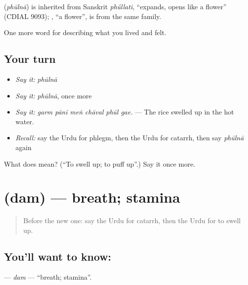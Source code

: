 \begin{cousinweb}
\textbf{} (\emph{phūlnā}) is inherited from Sanskrit \emph{phúllati}, \textquotedblleft{}expands, opens like a flower\textquotedblright{} (CDIAL 9093); \textbf{}, \textquotedblleft{}a flower\textquotedblright{}, is from the same family.
\end{cousinweb}

\begin{grammarlens}[title={What you've built}]
One more word for describing what you lived and felt.
\end{grammarlens}

\subsection*{Your turn}
\begin{itemize}
\raggedright
  \item \emph{Say it:} \emph{phūlnā}
  \item \emph{Say it:} \emph{phūlnā}, once more
  \item \emph{Say it:} \emph{garm pānī meṅ chāval phūl gae.} — The rice swelled up in the hot water.
  \item \emph{Recall:} say the Urdu for phlegm, then the Urdu for catarrh, then say \emph{phūlnā} again
\end{itemize}

\begin{tcolorbox}[breakable,colback=teal!4,colframe=teal!35!black,title={Before you move on}]
What does  mean? (\textquotedblleft{}To swell up; to puff up\textquotedblright{}.) Say it once more.
\end{tcolorbox}
\section[\texorpdfstring{\ur{دم} (dam)}{دم (dam)}]{ (dam) — breath; stamina}

\label{lesson:UR-C470-dam}



\begin{quote}
Before the new one: say the Urdu for catarrh, then the Urdu for to swell up.
\end{quote}

\subsection*{You'll want to know: }
\textbf{} — \emph{dam} — \textquotedblleft{}breath; stamina\textquotedblright{}.

